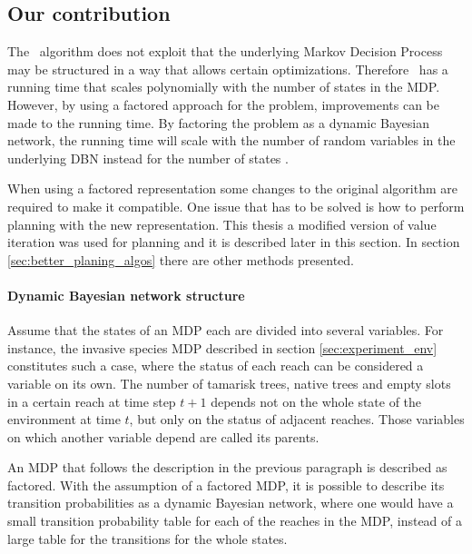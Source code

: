 \subsection{Our contribution}
\label{sec:e3_our_contribution}
\label{sec:factored_e3}

The \etre\ algorithm does not exploit that the underlying Markov Decision
Process may be structured in a way that allows certain optimizations. Therefore
\etre\ has a running time that scales polynomially with the number of states in
the MDP. However, by using a factored approach for the problem, improvements
can be made to the running time. By factoring the problem as a dynamic Bayesian
network, the running time will scale with the number of random variables in the
underlying DBN instead for the number of states
\parencite{kearns1999efficient}. 

When using a factored representation some changes to the original algorithm are
required to make it compatible. One issue that has to be solved is how to
perform  planning with the new representation. This thesis a modified version
of value iteration was used for planning and it is described later in this
section. In section \ref{sec:better_planing_algos} there are other methods
presented.


\paragraph{Dynamic Bayesian network structure}

Assume that the states of an MDP each are divided into several variables. For
instance, the invasive species MDP described in section
\ref{sec:experiment_env} constitutes such a case, where the status of each
reach can be considered a variable on its own. The number of tamarisk trees,
native trees and empty slots in a certain reach at time step $t+1$ depends not
on the whole state of the environment at time $t$, but only on the status of
adjacent reaches. Those variables on which another variable depend are called
its parents.  

An MDP that follows the description in the previous paragraph is described as
factored. With the assumption of a factored MDP, it is possible to describe its
transition probabilities as a dynamic Bayesian network, where one would have a
small transition probability table for each of the reaches in the MDP, instead
of a large table for the transitions for the whole states.


